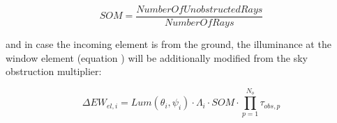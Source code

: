 \begin{equation}
SOM = \frac{{NumberOfUnobstructedRays}}{{NumberOfRays}}
\end{equation}

and in case the incoming element is from the ground, the illuminance at the window element (equation ) will be additionally modified from the sky obstruction multiplier:

\begin{equation}
\Delta E{W_{el,i}} = Lum({\theta_i},{\psi_i}) \cdot {\Lambda_i} \cdot SOM \cdot \prod\limits_{p = 1}^{{N_o}} {{\tau_{obs,p}}}
\end{equation}
